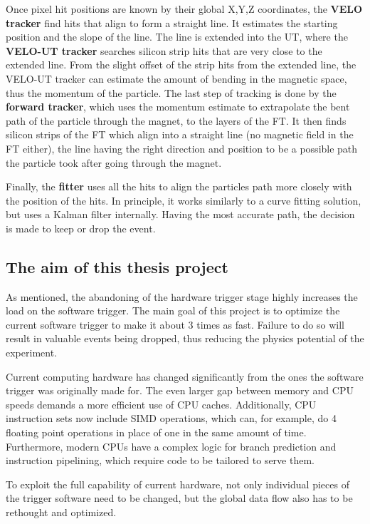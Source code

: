 \documentclass[12pt]{article}
\begin{document}
Once pixel hit positions are known by their global X,Y,Z coordinates, the \textbf{VELO tracker} find hits that align to form a straight line. It estimates the starting position and the slope of the line. The line is extended into the UT, where the \textbf{VELO-UT tracker} searches silicon strip hits that are very close to the extended line. From the slight offset of the strip hits from the extended line, the VELO-UT tracker can estimate the amount of bending in the magnetic space, thus the momentum of the particle. The last step of tracking is done by the \textbf{forward tracker}, which uses the momentum estimate to extrapolate the bent path of the particle through the magnet, to the layers of the FT. It then finds silicon strips of the FT which align into a straight line (no magnetic field in the FT either), the line having the right direction and position to be a possible path the particle took after going through the magnet.

Finally, the \textbf{fitter} uses all the hits to align the particles path more closely with the position of the hits. In principle, it works similarly to a curve fitting solution, but uses a Kalman filter internally. Having the most accurate path, the decision is made to keep or drop the event.


\subsection{The aim of this thesis project}

As mentioned, the abandoning of the hardware trigger stage highly increases the load on the software trigger. The main goal of this project is to optimize the current software trigger to make it about 3 times as fast. Failure to do so will result in valuable events being dropped, thus reducing the physics potential of the experiment.

Current computing hardware has changed significantly from the ones the software trigger was originally made for. The even larger gap between memory and CPU speeds demands a more efficient use of CPU caches. Additionally, CPU instruction sets now include SIMD operations, which can, for example, do 4 floating point operations in place of one in the same amount of time. Furthermore, modern CPUs have a complex logic for branch prediction and instruction pipelining, which require code to be tailored to serve them.

To exploit the full capability of current hardware, not only individual pieces of the trigger software need to be changed, but the global data flow also has to be rethought and optimized.
\end{document}
